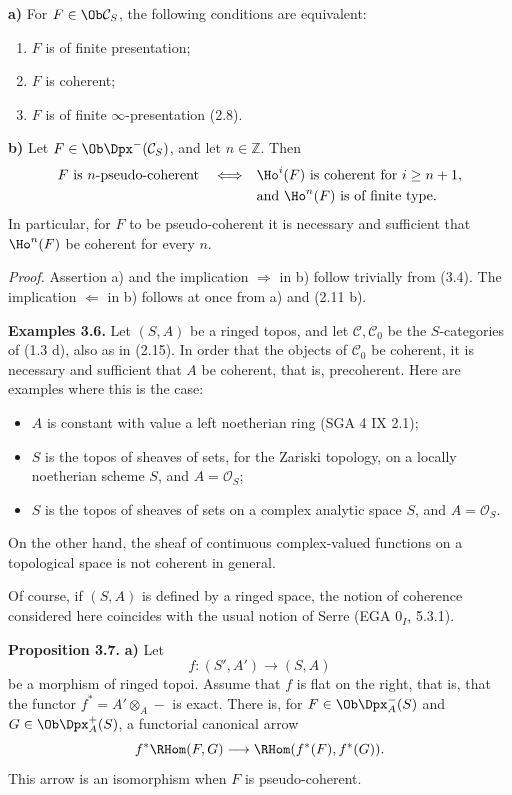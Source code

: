 \textbf{a)} For \(F\in\Ob\mathcal C_S\), the following conditions are equivalent:
\begin{enumerate}[label=(\roman*)]
\item \(F\) is of finite presentation;
\item \(F\) is coherent;
\item \(F\) is of finite \(\infty\)-presentation (2.8).
\end{enumerate}

\textbf{b)} Let \(F\in\Ob\Dpx^-(\mathcal C_S)\), and let \(n\in\mathbb Z\). Then
\[
\begin{split}
F\text{ is }n\text{-pseudo-coherent}
\quad\Longleftrightarrow\quad&
\Ho^i(F)\text{ is coherent for }i\geq n+1,\\
&\text{and }\Ho^n(F)\text{ is of finite type.}
\end{split}
\]
In particular, for \(F\) to be pseudo-coherent it is necessary and sufficient that \(\Ho^n(F)\) be coherent for every \(n\).

\emph{Proof.} Assertion a) and the implication \(\Rightarrow\) in b) follow trivially from (3.4). The implication \(\Leftarrow\) in b) follows at once from a) and (2.11 b).

\textbf{Examples 3.6.} Let \((S,A)\) be a ringed topos, and let \(\mathcal C,\mathcal C_0\) be the \(S\)-categories of (1.3 d), also as in (2.15). In order that the objects of \(\mathcal C_0\) be coherent, it is necessary and sufficient that \(A\) be coherent, that is, precoherent. Here are examples where this is the case:
\begin{itemize}
\item \(A\) is constant with value a left noetherian ring (SGA 4 IX 2.1);
\item \(S\) is the topos of sheaves of sets, for the Zariski topology, on a locally noetherian scheme \(S\), and \(A=\mathcal O_S\);
\item \(S\) is the topos of sheaves of sets on a complex analytic space \(S\), and \(A=\mathcal O_S\).
\end{itemize}
On the other hand, the sheaf of continuous complex-valued functions on a topological space is not coherent in general.

Of course, if \((S,A)\) is defined by a ringed space, the notion of coherence considered here coincides with the usual notion of Serre (EGA \(0_I\), 5.3.1).

\textbf{Proposition 3.7.} \textbf{a)} Let
\[
  f:(S',A')\longrightarrow(S,A)
\]
be a morphism of ringed topoi. Assume that \(f\) is flat on the right, that is, that the functor \(f^*=A'\otimes_A-\) is exact. There is, for \(F\in\Ob\Dpx_A^-(S)\) and \(G\in\Ob\Dpx_A^+(S)\), a functorial canonical arrow
\[
  f^*\RHom(F,G)\longrightarrow \RHom(f^*(F),f^*(G)).
\]
This arrow is an isomorphism when \(F\) is pseudo-coherent.

